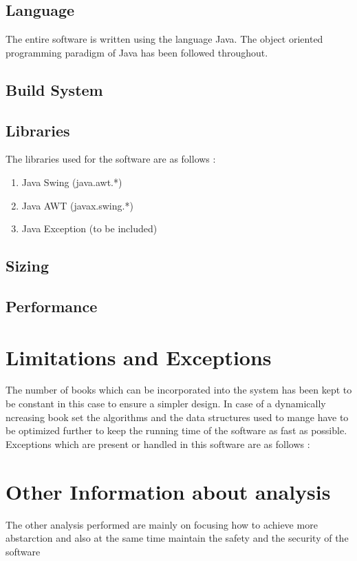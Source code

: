 \documentclass{article}
\begin{document}
\subsection{Language}
The entire software is written using the language Java.
The object oriented programming paradigm of Java has been followed throughout.
\subsection{Build System}

\subsection{Libraries}
The libraries used for the software are as follows :

\begin{enumerate}
\item Java Swing (java.awt.*)
\item Java AWT   (javax.swing.*)
\item Java Exception  (to be included)
\end{enumerate}
\subsection{Sizing}
\subsection{Performance}

\section{Limitations and Exceptions}
The number of books which can be incorporated into the system has been kept to be constant in this case to ensure a simpler design.
In case of a dynamically ncreasing book set the algorithms and the data structures used to mange have to be optimized further to keep the running time of the software as fast as possible.
\\
Exceptions which are present or handled in this software are as follows :

\section{Other Information about analysis}
The other analysis performed are mainly on focusing how to achieve more abstarction and also at the same time maintain the safety and the security of the software
\end{document}
